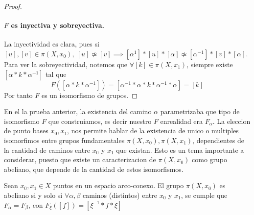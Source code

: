 \begin{proof}
  \paragraph{\(F\) es inyectiva y sobreyectiva.} La inyectividad es
  clara, pues si \([u],[v] \in \pi (X, x_0),\ [u] \not \simeq [v]
  \implies [\alpha^{1}] * [u] * [\alpha] \not \simeq [\alpha^{-1}] * [v]
  * [\alpha]\). Para ver la sobreyectividad, notemos que \(\forall [k] \in
  \pi (X, x_1) \), siempre existe \( [\alpha * k * \alpha^{-1}]\) tal
  que
  \[ F ([\alpha * k * \alpha^{-1}]) = [\alpha^{-1} * \alpha * k *
    \alpha^{-1} * \alpha] = [k]\]
  Por tanto \(F\) es un isomorfismo de grupos.
\end{proof}
En el la prueba anterior, la existencia del camino \(\alpha\)
parametrizaba que tipo de isomorfismo \(F\) que construiamos, es decir
nuestro \(F\) enrealidad era \(F_{\alpha}\). La eleccion de punto bases
\(x_0, x_1\), nos permite hablar de la existencia de unico o multiples
isomorfimos entre grupos fundamentales \(\pi (X, x_0), \pi (X, x_1) \),
dependientes de la cantidad de caminos entre \(x_0\) y \(x_1\) que
existan. Esto es un tema importante a considerar, puesto que existe un
caracterizacion de \(\pi (X, x_0) \) como grupo abeliano, que depende de
la cantidad de estos isomorfismos.
\begin{teorema}
  Sean \(x_0, x_1 \in X\) puntos en un espacio arco-conexo. El grupo
  \(\pi (X, x_0) \) es abeliano si y solo si \(\forall \alpha, \beta\)
  caminos (distintos) entre \(x_0\) y \(x_1\), se cumple que \(F_\alpha =
  F_\beta\), con \(F_{\xi} ([f]) = [\xi^{-1} * f * \xi] \)
\end{teorema}
